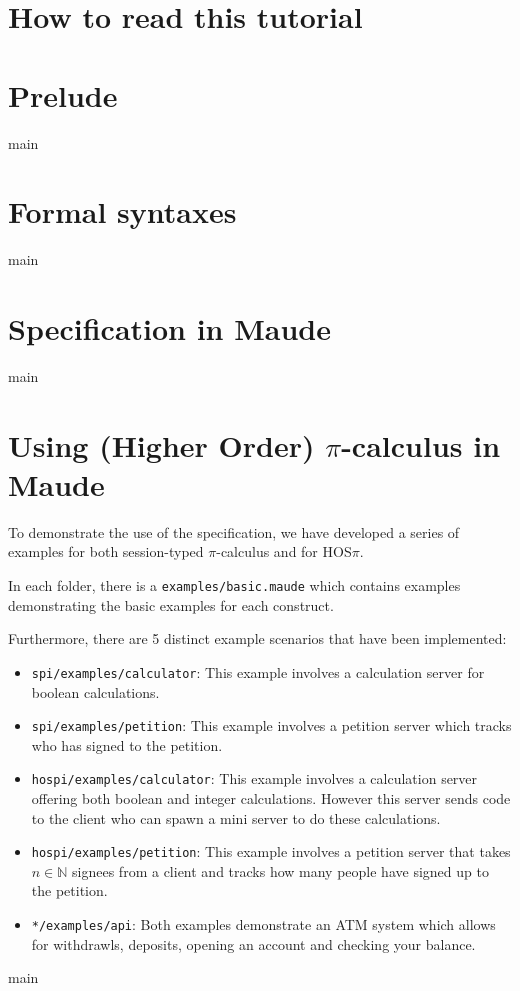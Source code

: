 \documentclass{article}
\begin{document}
\listoftodos

\maketitle

\newpage
\tableofcontents
\newpage

\section*{How to read this tutorial}


\newpage
\section{Prelude}
{main}

\newpage
\section{Formal syntaxes}
\label{formsyn}
{main}

\newpage
\section{Specification in Maude}
\label{using}
{main}

\newpage
\section{Using (Higher Order) \texorpdfstring{$\pi$}{pi}-calculus in Maude}
To demonstrate the use of the specification, we have developed a series of examples for both session-typed $\pi$-calculus and for HOS$\pi$.

In each folder, there is a \texttt{examples/basic.maude} which contains examples demonstrating the basic examples for each construct.

Furthermore, there are 5 distinct example scenarios that have been implemented:
\begin{itemize}
    \item \texttt{spi/examples/calculator}: This example involves a calculation server for boolean calculations.
    \item \texttt{spi/examples/petition}: This example involves a petition server which tracks who has signed to the petition. 
    \item \texttt{hospi/examples/calculator}: This example involves a calculation server offering both boolean and integer calculations. However this server sends code to the client who can spawn a mini server to do these calculations.
    \item \texttt{hospi/examples/petition}: This example involves a petition server that takes $n \in \mathbb{N}$ signees from a client and tracks how many people have signed up to the petition.
    \item \texttt{*/examples/api}: Both examples demonstrate an ATM system which allows for withdrawls, deposits, opening an account and checking your balance.
\end{itemize}

\newpage

\newpage

\newpage
\appendix
\newpage
{main}
\end{document}
